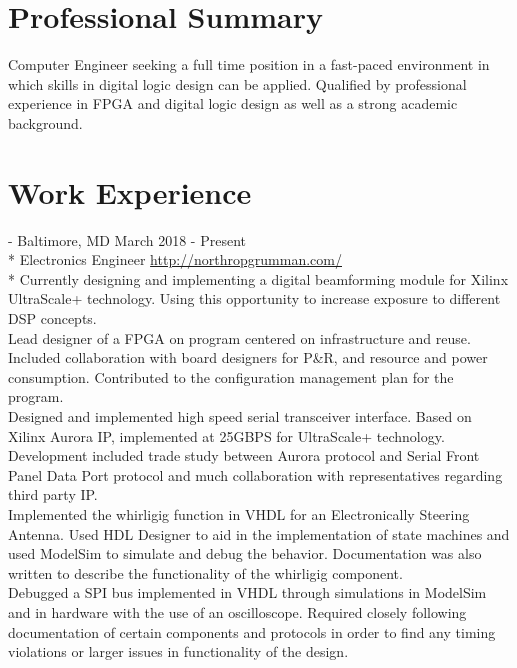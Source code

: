 \documentclass[a4paper,margin,line]{resume}
\newcommand{\rurl}[1]{\hfill {\footnotesize \url{#1}}}
\newcommand{\rdate}[1]{\hfill {\small #1}}
\renewcommand{\employer}[5]{ \item[#1] - #2 \rdate{#3} \\* #4 \rurl{#5} \\*}
\begin{document}
\begin{resume}
\section{\mysidestyle Professional Summary}
    Computer Engineer seeking a full time position in a fast-paced environment in which skills in digital logic design can be applied. Qualified by professional experience in FPGA and digital logic design as well as a strong academic background.

\section{\mysidestyle Work Experience}
    \begin{asparadesc}
        \employer{Northrop Grumman Corporation}{Baltimore, MD}{March 2018 - Present}{Electronics Engineer}
        {http://northropgrumman.com/}
        \small Currently designing and implementing a digital beamforming module for Xilinx UltraScale+ technology. Using this opportunity to increase exposure to different DSP concepts.\smallskip\\
        Lead designer of a FPGA on program centered on infrastructure and reuse. Included collaboration with board designers for P\&R, and resource and power consumption. Contributed to the configuration management plan for the program.\smallskip\\
        Designed and implemented high speed serial transceiver interface. Based on Xilinx Aurora IP, implemented at 25GBPS for UltraScale+ technology. Development included trade study between Aurora protocol and Serial Front Panel Data Port protocol and much collaboration with representatives regarding third party IP.\smallskip\\
        Implemented the whirligig function in VHDL for an Electronically Steering Antenna. Used HDL Designer to aid in the implementation of state machines and used ModelSim to simulate and debug the behavior. Documentation was also written to describe the functionality of the whirligig component.\smallskip\\
        Debugged a SPI bus implemented in VHDL through simulations in ModelSim and in hardware with the use of an oscilloscope. Required closely following documentation of certain components and protocols in order to find any timing violations or larger issues in functionality of the design.

\end{asparadesc}
\end{resume}
\end{document}
